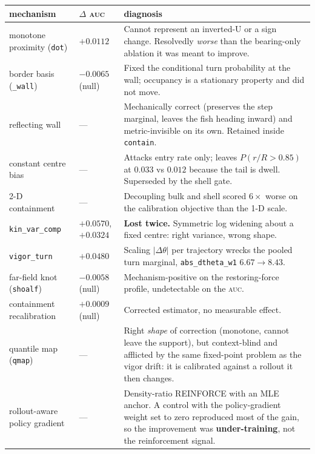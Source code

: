 \documentclass[11pt,a4paper]{article}
\newcommand{\dth}{\ensuremath{\Delta\theta}}
\newcommand{\auc}{\textsc{auc}}
\newcommand{\code}[1]{\texttt{\small #1}}
\begin{document}
\begin{center}\small
\renewcommand{\arraystretch}{1.25}
\begin{tabular}{p{}p{}p{}}
\toprule
\textbf{mechanism} & \textbf{$\Delta$ \auc} & \textbf{diagnosis} \\
\midrule
monotone proximity (\code{dot}) & $+0.0112$ &
Cannot represent an inverted-U or a sign change. Resolvedly \emph{worse} than the
bearing-only ablation it was meant to improve. \\
border basis (\code{\_wall}) & $-0.0065$ (null) &
Fixed the conditional turn probability at the wall; occupancy is a stationary property
and did not move. \\
reflecting wall & --- &
Mechanically correct (preserves the step marginal, leaves the fish heading inward) and
metric-invisible on its own. Retained inside \code{contain}. \\
constant centre bias & --- &
Attacks entry rate only; leaves $P(r/R{>}0.85)$ at $0.033$ vs $0.012$ because the tail is
dwell. Superseded by the shell gate. \\
2-D containment & --- &
Decoupling bulk and shell scored $6\times$ worse on the calibration objective than the
1-D scale. \\
\code{kin\_var\_comp} & $+0.0570$, $+0.0324$ &
\textbf{Lost twice.} Symmetric log widening about a fixed centre: right variance, wrong
shape. \\
\code{vigor\_turn} & $+0.0480$ &
Scaling $|\dth|$ per trajectory wrecks the pooled turn marginal,
\code{abs\_dtheta\_w1} $6.67 \to 8.43$. \\
far-field knot (\code{shoalf}) & $-0.0058$ (null) &
Mechanism-positive on the restoring-force profile, undetectable on the \auc. \\
containment recalibration & $+0.0009$ (null) &
Corrected estimator, no measurable effect. \\
quantile map (\code{qmap}) & --- &
Right \emph{shape} of correction (monotone, cannot leave the support), but context-blind
and afflicted by the same fixed-point problem as the vigor drift: it is calibrated against
a rollout it then changes. \\
rollout-aware policy gradient & --- &
Density-ratio REINFORCE with an MLE anchor. A control with the policy-gradient weight set
to zero reproduced most of the gain, so the improvement was \textbf{under-training}, not
the reinforcement signal. \\
\bottomrule
\end{tabular}
\end{center}
\end{document}
